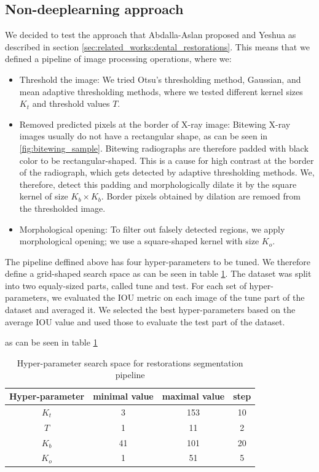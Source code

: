 \subsection{Non-deeplearning approach}
We decided to test the approach that Abdalla-Aslan proposed and Yeshua \cite{AbdallaAslan2020, Yeshua2019} as described in section \ref{sec:related_works:dental_restorations}. This means that we defined a pipeline of image processing operations, where we:
\begin{itemize}
    \item Threshold the image: We tried Otsu's thresholding method, Gaussian, and mean adaptive thresholding methods, where we tested different kernel sizes $K_t$ and threshold values $T$.
    \item Removed predicted pixels at the border of X-ray image: Bitewing X-ray images usually do not have a rectangular shape, as can be seen in \ref{fig:bitewing_sample}. Bitewing radiographs are therefore padded with black color to be rectangular-shaped. This is a cause for high contrast at the border of the radiograph, which gets detected by adaptive thresholding methods. We, therefore, detect this padding and morphologically dilate it by the square kernel of size $K_b \times K_b$. Border pixels obtained by dilation are remoed from the thresholded image.
    \item Morphological opening: To filter out falsely detected regions, we apply morphological opening; we use a square-shaped kernel with size $K_o$.
\end{itemize}

The pipeline deffined above has four hyper-parameters to be tuned. We therefore define a grid-shaped search space as can be seen in table \ref{tab:hyper_param_segmentation}. The dataset was split into two equaly-sized parts, called tune and test. For each set of hyper-parameters, we evaluated the IOU metric on each image of the tune part of the dataset and averaged it. We selected the best hyper-parameters based on the average IOU value and used those to evaluate the test part of the dataset.

as can be seen in table \ref{tab:hyper_param_segmentation}
\begin{table}
    \begin{tabular}{|c|c|c|c|}
        \hline
        Hyper-parameter & minimal value & maximal value & step \\ \hline
        $K_t$           & 3             & 153           & 10   \\ \hline
        $T$             & 1             & 11            & 2    \\ \hline
        $K_b$           & 41            & 101           & 20   \\ \hline
        $K_o$           & 1             & 51            & 5    \\ \hline
    \end{tabular}
    \caption{Hyper-parameter search space for restorations segmentation pipeline}
    \label{tab:hyper_param_segmentation}
\end{table}

